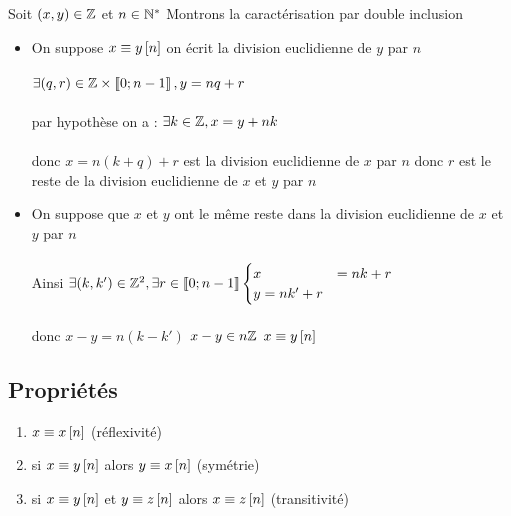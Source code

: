 \begin{dem}
    Soit \(\left(x,y\right) \in \mathbb{Z}\) et \(n \in \mathbb{N}^*\) Montrons la caractérisation par double inclusion
    \begin{itemize}
        \item \impdir On suppose \(x \equiv y \left[n\right]\) on écrit la division euclidienne de \(y\) par \(n\)\\~\\
        \(\exists (q,r) \in \mathbb{Z} \times \left\llbracket0;n-1\right\rrbracket, y =nq+r\)\\~\\
        par hypothèse on a : \(\exists k \in \mathbb{Z}, x = y + nk\)\\~\\
        donc \(x = n(k+q)+r\) est la division euclidienne de \(x\) par \(n\) donc \(r\) est le reste de la division euclidienne de \(x\) et \(y\) par \(n\)
        \item \imprec On suppose que \(x\) et \(y\) ont le même reste dans la division euclidienne de \(x\) et \(y\) par \(n\) \\~\\
        Ainsi \(\exists(k,k') \in \mathbb{Z}^2, \exists r \in \left\llbracket0;n-1\right\rrbracket \begin{cases}
            x &= nk+r \\
            y = nk' +r
        \end{cases}\)\\~\\
        donc \(x-y = n(k-k')\) \ie \(x-y \in n\mathbb{Z}\) \ie \(x \equiv y \left[n\right]\)
    \end{itemize}
\end{dem}

\subsection{Propriétés}
\begin{defprop}
    \begin{enumerate}
        \item \(x \equiv x \left[n\right]\) \hfill (réflexivité)
        \item si \(x \equiv y \left[n\right]\) alors \(y \equiv x \left[n\right]\) \hfill(symétrie)
        \item si \(x \equiv y \left[n\right] \) et \(y \equiv z \left[n\right]\) alors \(x \equiv z \left[n\right]\) \hfill(transitivité)
    \end{enumerate}
\end{defprop}

